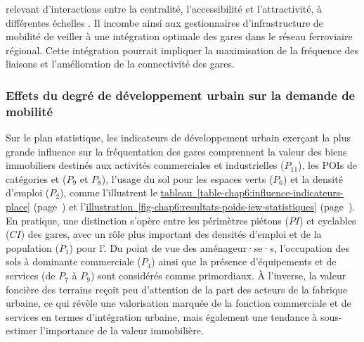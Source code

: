 \begin{refsegment}
{} relevant d'interactions entre la centralité, l'accessibilité et l'attractivité, à différentes échelles \textcolor{blue}{\autocite[13]{bavoux_nodalite_2005}}. Il incombe ainsi aux gestionnaires d'infrastructure de mobilité de veiller à une intégration optimale des gares dans le réseau ferroviaire régional. Cette intégration pourrait impliquer la maximisation de la fréquence des liaisons et l'amélioration de la connectivité des gares.%

\subsubsection*{Effets du degré de développement urbain sur la demande de mobilité
    \label{chap6:results-influence-indicateurs-place}
    }

Sur le plan statistique, les indicateurs de développement urbain exerçant la plus grande influence sur la fréquentation des gares comprennent la valeur des biens immobiliers destinés aux activités commerciales et industrielles (\(P_{11}\)), les \acrshort{POIs} de catégories  et  (\(P_{9}\) et \(P_{8}\)), l'usage du sol pour les espaces verts (\(P_{6}\)) et la densité d'emploi (\(P_{2}\)), comme l'illustrent le \hyperref[table-chap6:influence-indicateurs-place]{tableau~\ref{table-chap6:influence-indicateurs-place}} (page~\pageref{table-chap6:influence-indicateurs-place}) et l'\hyperref[fig-chap6:resultats-poids-iew-statistiques]{illustration~\ref{fig-chap6:resultats-poids-iew-statistiques}} (page~\pageref{fig-chap6:resultats-poids-iew-statistiques}). En pratique, une distinction s'opère entre les périmètres piétons (\(PI\)) et cyclables (\(CI\)) des gares, avec un rôle plus important des densités d'emploi et de la population (\(P_{1}\)) pour l'. Du point de vue des aménageur·se·s, l'occupation des sols à dominante commerciale (\(P_{4}\)) ainsi que la présence d'équipements et de services (de \(P_{7}\) à \(P_{9}\)) sont considérés comme primordiaux. À l'inverse, la valeur foncière des terrains reçoit peu d'attention de la part des acteurs de la fabrique urbaine, ce qui révèle une valorisation marquée de la fonction commerciale et de services en termes d'intégration urbaine, mais également une tendance à sous-estimer l'importance de la valeur immobilière.%



\end{refsegment}

